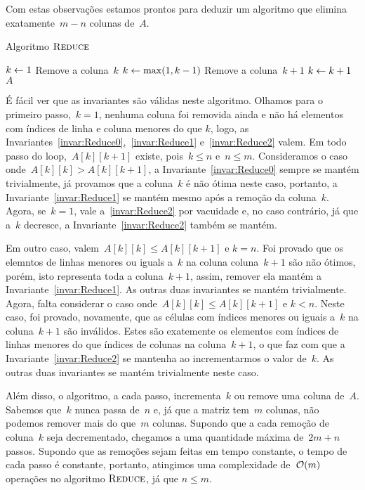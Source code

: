 Com estas observações estamos prontos para deduzir um algoritmo que elimina exatamente~$m-n$ colunas de~$A$. 

\newcommand{\Reduce}{\textsc{Reduce}}
\begin{algorithm}[H]
\caption{Algoritmo $\Reduce$}
\label{SMAWK:algo:Reduce}
\begin{algorithmic}[1]
\Function{\Reduce}{A}
    \State $k \leftarrow 1$
            \State Remove a coluna~$k$
            \State $k \leftarrow \max(1,k-1)$
        \Else
                \State Remove a coluna~$k+1$
            \Else
                \State $k \leftarrow k+1$
            \EndIf
        \EndIf
    \EndWhile
    \State \Return $A$
\EndFunction
\end{algorithmic}
\end{algorithm}

É fácil ver que as invariantes são válidas neste algoritmo. Olhamos para o primeiro passo,~$k = 1$, nenhuma coluna foi removida ainda e não há elementos com índices de linha e coluna menores do que $k$, logo, as Invariantes~\ref{invar:Reduce0},~\ref{invar:Reduce1} e~\ref{invar:Reduce2} valem. Em todo passo do loop,~$A[k][k+1]$ existe, pois~$k \leq n$ e~$n \leq m$. Consideramos o caso onde~$A[k][k] > A[k][k+1]$, a Invariante~\ref{invar:Reduce0} sempre se mantém trivialmente, já provamos que a coluna~$k$ é não ótima neste caso, portanto, a Invariante~\ref{invar:Reduce1} se mantém mesmo após a remoção da coluna~$k$. Agora, se~$k=1$, vale a~\ref{invar:Reduce2} por vacuidade e, no caso contrário, já que a~$k$ decresce, a Invariante~\ref{invar:Reduce2} também se mantém. 

Em outro caso, valem~$A[k][k] \leq A[k][k+1]$ e $k = n$. Foi provado que os elemntos de linhas menores ou iguals a~$k$ na coluna coluna~$k+1$ são não ótimos, porém, isto representa toda a coluna~$k+1$, assim, remover ela mantém a Invariante~\ref{invar:Reduce1}. As outras duas invariantes se mantém trivialmente. Agora, falta considerar o caso onde~$A[k][k] \leq A[k][k+1]$ e $k < n$. Neste caso, foi provado, novamente, que as células com índices menores ou iguais a~$k$ na coluna~$k+1$ são inválidos. Estes são exatemente os elementos com índices de linhas menores do que índices de colunas na coluna~$k+1$, o que faz com que a Invariante~\ref{invar:Reduce2} se mantenha ao incrementarmos o valor de~$k$. As outras duas invariantes se mantém trivialmente neste caso.

Além disso, o algoritmo, a cada passo, incrementa~$k$ ou remove uma coluna de~$A$. Sabemos que~$k$ nunca passa de~$n$ e, já que a matriz tem~$m$ colunas, não podemos remover mais do que~$m$ colunas. Supondo que a cada remoção de coluna~$k$ seja decrementado, chegamos a uma quantidade máxima de~$2m + n$ passos. Supondo que as remoções sejam feitas em tempo constante, o tempo de cada passo é constante, portanto, atingimos uma complexidade de~$\mathcal{O}(m)$ operações no algoritmo $\Reduce$, já que $n \leq m$.

